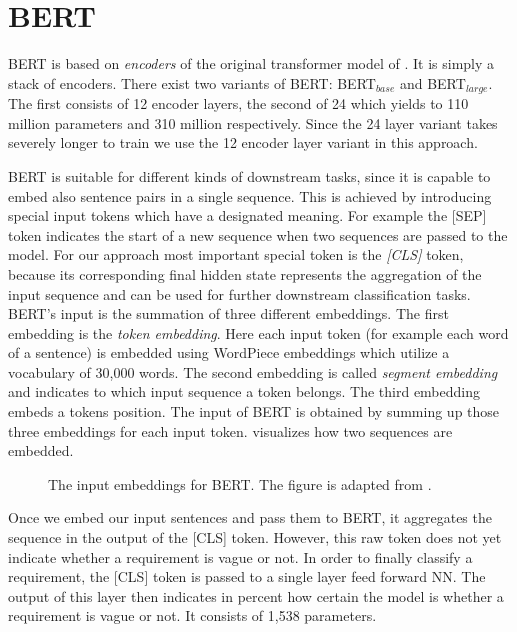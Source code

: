 \section{BERT}
\label{chp:approach:sec:BERT}

\Ac{BERT} is based on \textit{encoders} of the original transformer model of \textcite{Vaswani:2017}.
It is simply a stack of encoders.
There exist two variants of \ac{BERT}: \ac{BERT}$_{base}$ and \ac{BERT}$_{large}$.
The first consists of 12 encoder layers, the second of 24 which yields to 110 million parameters and 310 million respectively.
Since the 24 layer variant takes severely longer to train we use the 12 encoder layer variant in this approach. \parencite{Devlin:2018}

\Ac{BERT} is suitable for different kinds of downstream tasks, since it is capable to embed also sentence pairs in a single sequence.
This is achieved by introducing special input tokens which have a designated meaning.
For example the [SEP] token indicates the start of a new sequence when two sequences are passed to the model.
For our approach most important special token is the \textit{[CLS]} token, because its corresponding final hidden state represents the aggregation of the input sequence and can be used for further downstream classification tasks.
\Ac{BERT}'s input is the summation of three different embeddings.
The first embedding is the \textit{token embedding}.
Here each input token (for example each word of a sentence) is embedded using WordPiece embeddings \parencite{Wu:2016} which utilize a vocabulary of 30,000 words.
The second embedding is called \textit{segment embedding} and indicates to which input sequence a token belongs.
The third embedding embeds a tokens position.
The input of \ac{BERT} is obtained by summing up those three embeddings for each input token.
 visualizes how two sequences are embedded. \parencite{Devlin:2018}
\begin{figure}[htpb]
    \centering
    \def\svgwidth{\columnwidth}
    \scalebox{1.07}{}
    \caption[BERT Input Embeddings]{The input embeddings for \ac{BERT}. The figure is adapted from \textcite{Devlin:2018}.}\label{fig:approach:BERT:input_embedding}
\end{figure}

Once we embed our input sentences and pass them to \ac{BERT}, it aggregates the sequence in the output of the [CLS] token.
However, this raw token does not yet indicate whether a requirement is vague or not.
In order to finally classify a requirement, the [CLS] token is passed to a single layer feed forward \ac{NN}.
The output of this layer then indicates in percent how certain the model is whether a requirement is vague or not.
It consists of 1,538 parameters.
